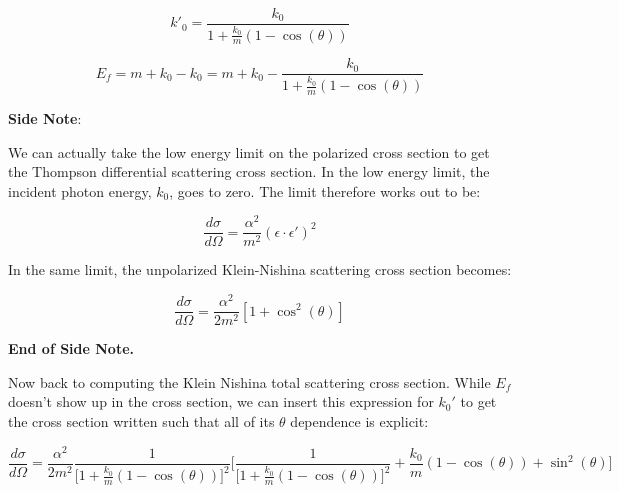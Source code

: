 \documentclass[a4]{article}
\begin{document}
    \begin{equation}
        k'_0 = \frac{k_0}{1 + \frac{k_0}{m} (1 - \cos(\theta))}
    \end{equation}

    \begin{equation}
        E_f = m + k_0 - k_0 = m + k_0 - \frac{k_0}{1 + \frac{k_0}{m} (1 - \cos(\theta))}
    \end{equation}

    \textbf{Side Note}:

    We can actually take the low energy limit on the polarized cross section to get the Thompson differential scattering cross section. In the low energy limit, the incident photon energy, $k_0$,
    goes to zero. The limit therefore works out to be:

    \begin{framed}
        \begin{equation}
            \frac{d \sigma}{d \Omega} = \frac{\alpha^2}{m^2} (\epsilon \cdot \epsilon')^2
        \end{equation}
    \end{framed}

    In the same limit, the unpolarized Klein-Nishina scattering cross section becomes:

    \begin{framed}
        \begin{equation}
            \frac{d \sigma}{d \Omega} = \frac{\alpha^2}{2 m^2} [1 + \cos^2 (\theta)]
        \end{equation}
    \end{framed}

    \textbf{End of Side Note.}

    Now back to computing the Klein Nishina total scattering cross section. While $E_f$ doesn't show up in the cross section, we can insert this expression for $k_{0}'$ to get the cross section
    written such that all of its $\theta$ dependence is explicit:

    \begin{framed}
        \begin{equation}
            \frac{d \sigma}{d \Omega} = \frac{\alpha^2}{2 m^2} \frac{1}{\Big[1 + \frac{k_0}{m} (1 - \cos (\theta)) \Big]^2} \Big[ \frac{1}{\Big[1 + \frac{k_0}{m} (1 - \cos (\theta)) \Big]^2} + \frac{k_0}{m} (1 - \cos (\theta)) + \sin^2 (\theta) \Big]
        \end{equation}
    \end{framed}
\end{document}
